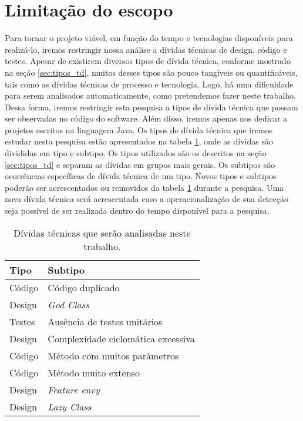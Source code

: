 \section{Limitação do escopo}

Para tornar o projeto viável, em função do tempo e tecnologias disponíveis para realizá-lo, iremos restringir nossa análise a dívidas técnicas de design, código e testes. Apesar de existirem diversos tipos de dívida técnica, conforme mostrado na seção \ref{sec:tipos_td}, muitos desses tipos são pouco tangíveis ou quantificáveis, tais como as dívidas técnicas de processo e tecnologia. Logo, há uma dificuldade para serem analisados automaticamente, como pretendemos fazer neste trabalho. Dessa forma, iremos restringir esta pesquisa a tipos de dívida técnica que possam ser observadas no código do software.  Além disso,  iremos apenas nos dedicar a projetos escritos na linguagem Java. Os tipos de dívida técnica que iremos estudar nesta pesquisa estão apresentados na tabela \ref{table:tiposDivida}, onde as dívidas são divididas em tipo e subtipo. Os tipos utilizados são os descritos na seção \ref{sec:tipos_td} e separam as dívidas em grupos mais gerais. Os subtipos são ocorrências específicas de dívida técnica de um tipo.  Novos tipos e subtipos poderão ser acrescentados ou removidos da tabela \ref{table:tiposDivida} durante a pesquisa. Uma nova dívida técnica será acrescentada caso a operacionalização de sua detecção seja possível de ser realizada dentro do tempo disponível para a pesquisa. 


\begin{table}[]
\centering
\caption{Dívidas técnicas que serão analisadas neste trabalho.}
\label{table:tiposDivida}
\begin{tabular}{|l|l|}
\hline
\bf{Tipo}   & \bf{Subtipo}                            \\ \hline
Código & Código duplicado                   \\ \hline
Design & \textit{God Class}\cite{fowler2009refactoring}                          \\\hline
Testes & Ausência de testes unitários       \\\hline
Design & Complexidade ciclomática excessiva \\\hline
Código       & Método com muitos parâmetros                                    \\\hline
Código       & Método muito extenso                                    \\\hline
Design       & \textit{Feature envy}\cite{fowler2009refactoring}                                   \\\hline
Design       & \textit{Lazy Class}     \cite{fowler2009refactoring}    \\\hline                         
\end{tabular}
\end{table}

